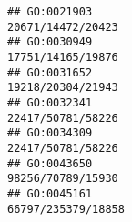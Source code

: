 \documentclass[
]{article}
\begin{document}
\begin{verbatim}
## GO:0021903                                                                                                                                                                                                                                                                                                                                                                                            20671/14472/20423
## GO:0030949                                                                                                                                                                                                                                                                                                                                                                                            17751/14165/19876
## GO:0031652                                                                                                                                                                                                                                                                                                                                                                                            19218/20304/21943
## GO:0032341                                                                                                                                                                                                                                                                                                                                                                                            22417/50781/58226
## GO:0034309                                                                                                                                                                                                                                                                                                                                                                                            22417/50781/58226
## GO:0043650                                                                                                                                                                                                                                                                                                                                                                                            98256/70789/15930
## GO:0045161                                                                                                                                                                                                                                                                                                                                                                                           66797/235379/18858

\end{verbatim}
\end{document}
